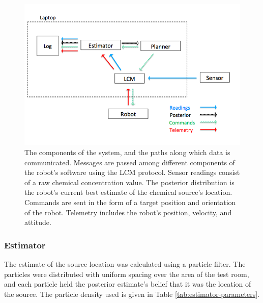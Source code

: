 \documentclass[submit, 12pt]{aiaa-pretty-modified}
\begin{document}
\begin{figure}
\begin{center}
\includegraphics[width=6in]{img/acquisition.pdf}
\caption[Data acquisition flowchart]{The components of the system, and the paths along which data is
  communicated. Messages are passed among different components of the robot's
  software using the LCM protocol.  Sensor readings consist of a raw
  chemical concentration value.  The
  posterior distribution is the robot's current best estimate of the chemical
  source's location. Commands are sent in the form of a target position and
  orientation of the robot. Telemetry includes the robot's position, velocity,
  and attitude.}
\label{fig:acquisition}
\end{center}
\end{figure}

\subsubsection{Estimator}

The estimate of the source location was calculated using a particle
filter\cite{maskell2001tutorial}. The particles were distributed with uniform
spacing over the area of the test room, and each particle held the posterior
estimate's belief that it was the location of the source. The particle density
used is given in Table
\ref{tab:estimator-parameters}. 
\end{document}
